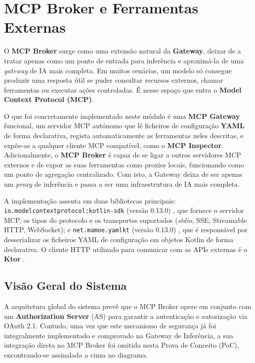 \chapter{MCP Broker e Ferramentas Externas}

O \textbf{MCP Broker} surge como uma extensão natural da \textbf{Gateway}, deixar de a tratar apenas como um ponto de entrada para inferência e aproximá-la de uma \textit{gateway} de IA mais completa. Em muitos cenários, um modelo só consegue produzir uma resposta útil se puder consultar recursos externos, chamar ferramentas ou executar ações controladas. É nesse espaço que entra o \textbf{Model Context Protocol (MCP)}.

O que foi concretamente implementado neste módulo é uma \textbf{MCP Gateway} funcional, um servidor MCP autónomo que lê ficheiros de configuração \textbf{YAML} de forma declarativa, regista automaticamente as ferramentas neles descritas, e expõe-as a qualquer cliente MCP compatível, como o \textbf{MCP Inspector}. Adicionalmente, o \textbf{MCP Broker} é capaz de se ligar a outros servidores MCP externos e de expor as suas ferramentas como proxies locais, funcionando como um ponto de agregação centralizado. Com isto, a Gateway deixa de ser apenas um \textit{proxy} de inferência e passa a ser uma infraestrutura de IA mais completa.

A implementação assenta em duas bibliotecas principais: \texttt{io.modelcontextprotocol:kotlin-sdk} (versão 0.13.0) \cite{mcp_kotlin_sdk}, que fornece o servidor MCP, os tipos do protocolo e os transportes suportados (\textit{stdio}, SSE, Streamable HTTP, WebSocket); e \texttt{net.mamoe.yamlkt} (versão 0.13.0) \cite{yamlkt_ref}, que é responsável por desserializar os ficheiros YAML de configuração em objetos Kotlin de forma declarativa. O cliente HTTP utilizado para comunicar com as APIs externas é o \textbf{Ktor} \cite{ktor_ref}.


\section{Visão Geral do Sistema}

A arquitetura global do sistema prevê que o MCP Broker opere em conjunto com um \textbf{Authorization Server} (AS) para garantir a autenticação e autorização via OAuth 2.1. Contudo, uma vez que este mecanismo de segurança já foi integralmente implementado e comprovado na Gateway de Inferência, a sua integração direta no MCP Broker foi omitida nesta Prova de Conceito (PoC), encontrando-se assinalada a cinza no diagrama. 


